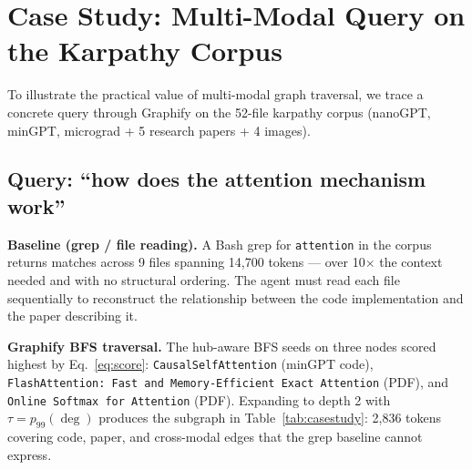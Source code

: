 \section{Case Study: Multi-Modal Query on the Karpathy Corpus}
\label{sec:case}

To illustrate the practical value of multi-modal graph traversal, we trace a
concrete query through Graphify on the 52-file karpathy corpus (nanoGPT,
minGPT, micrograd + 5 research papers + 4 images).

\subsection{Query: ``how does the attention mechanism work''}

\textbf{Baseline (grep / file reading).} A Bash grep for \texttt{attention} in
the corpus returns matches across 9 files spanning 14,700 tokens --- over 10$\times$
the context needed and with no structural ordering. The agent must read each file
sequentially to reconstruct the relationship between the code implementation and
the paper describing it.

\textbf{Graphify BFS traversal.} The hub-aware BFS seeds on three nodes scored
highest by Eq.~\eqref{eq:score}: \texttt{CausalSelfAttention} (minGPT code),
\texttt{FlashAttention: Fast and Memory-Efficient Exact Attention} (PDF), and
\texttt{Online Softmax for Attention} (PDF). Expanding to depth 2 with $\tau =
p_{99}(\deg)$ produces the subgraph in Table~\ref{tab:casestudy}: 2,836 tokens
covering code, paper, and cross-modal edges that the grep baseline cannot express.

